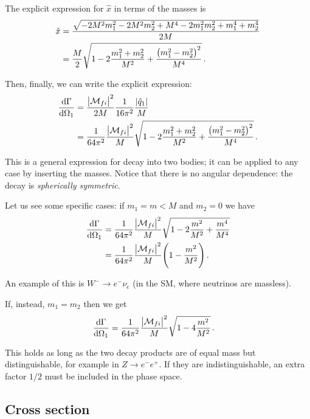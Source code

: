 \documentclass[main.tex]{subfiles}
\begin{document}
The explicit expression for \(\hat{x}\) in terms of the masses is 
%
\begin{align}
\hat{x} &= \frac{\sqrt{-2 M^2 m_1^2-2 M^2 m_2^2+M^4-2 m_1^2 m_2^2+m_1^4+m_2^4}}{2 M}  \\
&= \frac{M}{2} \sqrt{1 -2\frac{m_1^2+m_2^2}{M^2}+ \frac{\qty(m_1^2-m_2^2)^2}{M^{4}}}
\,.
\end{align}

Then, finally, we can write the explicit expression: 
%
\begin{align}
\dv{\Gamma }{\Omega_1 } 
&= \frac{\abs{\mathcal{M}_{fi}}^2}{2M}
\frac{1}{16 \pi^2}
\frac{\abs{\hat{q}_{1}}}{M}  \\
&= \frac{1}{64 \pi^2}
\frac{\abs{\mathcal{M}_{fi}}^2}{M}
\sqrt{1 -2\frac{m_1^2+m_2^2}{M^2}+ \frac{\qty(m_1^2-m_2^2)^2}{M^{4}}}
\,.
\end{align}

This is a general expression for decay into two bodies; it can be applied to any case by inserting the masses. 
Notice that there is no angular dependence: the decay is \emph{spherically symmetric}. 

Let us see some specific cases: if \(m_1 = m < M\) and \(m_2 = 0\) we have 
%
\begin{align}
\dv{\Gamma }{\Omega_1 } &= \frac{1}{64 \pi^2}
\frac{\abs{\mathcal{M}_{fi}}^2}{M}
\sqrt{1 - 2\frac{m^2}{M^2} + \frac{m^4}{M^{4}}}  \\
&= \frac{1}{64 \pi^2}
\frac{\abs{\mathcal{M}_{fi}}^2}{M}
\qty(1 - \frac{m^2}{M^2})
\,.
\end{align}

An example of this is \(W^{-} \to e^{-} \nu_{e}\) (in the SM, where neutrinos are massless).

If, instead, \(m_1 = m_2 \) then we get 
%
\begin{align}
\dv{\Gamma }{\Omega_1 } &= \frac{1}{64 \pi^2}
\frac{\abs{\mathcal{M}_{fi}}^2}{M}
\sqrt{1 - 4\frac{m^2}{M^2}}
\,.
\end{align}

This holds as long as the two decay products are of equal mass but distinguishable, for example in \(Z \to e^{-} e^{+}\). 
If they are indistinguishable, an extra factor \(1/2\) must be included in the phase space. 


\subsection{Cross section}
\end{document}
